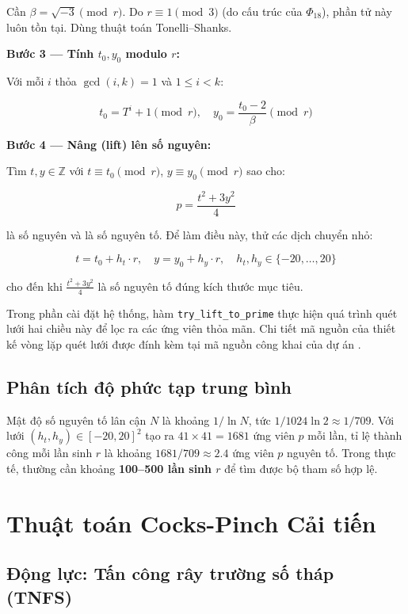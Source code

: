 Cần \(\beta = \sqrt{-3} \pmod{r}\). Do \(r \equiv 1 \pmod{3}\) (do cấu
trúc của \(\Phi_{18}\)), phần tử này luôn tồn tại. Dùng thuật toán
Tonelli--Shanks.

\textbf{Bước 3 --- Tính \(t_0, y_0\) modulo \(r\):}

Với mỗi \(i\) thỏa \(\gcd(i, k) = 1\) và \(1 \leq i < k\):

\[t_0 = T^i + 1 \pmod{r}, \quad y_0 = \frac{t_0 - 2}{\beta} \pmod{r}\]

\textbf{Bước 4 --- Nâng (lift) lên số nguyên:}

Tìm \(t, y \in \mathbb{Z}\) với \(t \equiv t_0 \pmod{r}\),
\(y \equiv y_0 \pmod{r}\) sao cho:

\[p = \frac{t^2 + 3y^2}{4}\]

là số nguyên và là số nguyên tố. Để làm điều này, thử các dịch chuyển
nhỏ:

\[t = t_0 + h_t \cdot r, \quad y = y_0 + h_y \cdot r, \quad h_t, h_y \in \{-20, \ldots, 20\}\]

cho đến khi \(\frac{t^2 + 3y^2}{4}\) là số nguyên tố đúng kích thước mục
tiêu.

Trong phần cài đặt hệ thống, hàm \texttt{try\_lift\_to\_prime} thực hiện
quá trình quét lưới hai chiều này để lọc ra các ứng viên thỏa mãn. Chi
tiết mã nguồn của thiết kế vòng lặp quét lưới được đính kèm tại mã nguồn
công khai của dự án \citep{LumenMath}.

\subsection{Phân tích độ phức tạp trung
bình}\label{phuxe2n-tuxedch-ux111ux1ed9-phux1ee9c-tux1ea1p-trung-buxecnh}

Mật độ số nguyên tố lân cận \(N\) là khoảng \(1/\ln N\), tức
\(1/1024\ln 2 \approx 1/709\). Với lưới \((h_t, h_y) \in [-20, 20]^2\)
tạo ra \(41 \times 41 = 1681\) ứng viên \(p\) mỗi lần, tỉ lệ thành công
mỗi lần sinh \(r\) là khoảng \(1681/709 \approx 2.4\) ứng viên \(p\)
nguyên tố. Trong thực tế, thường cần khoảng \textbf{100--500 lần sinh
\(r\)} để tìm được bộ tham số hợp lệ.

\section{Thuật toán Cocks-Pinch Cải
tiến}\label{thuux1eadt-touxe1n-cocks-pinch-cux1ea3i-tiux1ebfn}

\subsection{Động lực: Tấn công rây trường số tháp
(TNFS)}\label{ux111ux1ed9ng-lux1ef1c-tux1ea5n-cuxf4ng-ruxe2y-trux1b0ux1eddng-sux1ed1-thuxe1p-tnfs}

